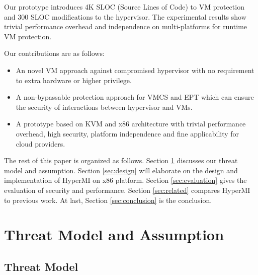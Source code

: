 \documentclass[conference]{IEEEtran}
\begin{document}
Our prototype introduces 4K SLOC (Source Lines of Code) to VM protection and 300 SLOC modifications to the hypervisor.
The experimental results show trivial performance overhead and independence on multi-platforms for runtime VM protection. 


Our contributions are as follows:
\begin{itemize}
\item{An novel VM approach against compromised hypervisor with no requirement to extra hardware or higher privilege.} 
\item{A non-bypassable protection approach for VMCS and EPT  which can ensure the security of interactions between hypervisor and VMs.}


\item{A prototype based on KVM and x86 architecture with trivial performance overhead, high security, platform independence and fine applicability  for cloud providers.}

\end{itemize}
The rest of this paper is organized as follows. Section \ref{sec:threat} discusses our threat model and assumption. Section \ref{sec:design} will elaborate on the design and implementation of HyperMI on x86 platform. Section \ref{sec:evaluation} gives the evaluation of security and performance. Section \ref{sec:related} compares HyperMI to previous work. At last, Section \ref{sec:conclusion} is the conclusion.
 



\section{Threat Model and Assumption}\label{sec:threat}


\subsection{Threat Model} \label {threat}
\end{document}
